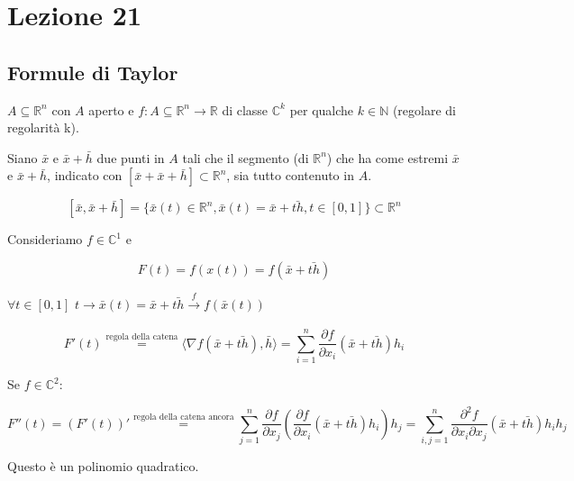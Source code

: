 \documentclass[../appunti-analisi.tex]{subfiles}
\begin{document}
\section{Lezione 21}

\subsection{Formule di Taylor}

$A \subseteq \mathbb{R}^{n}$ con $A$ aperto e $f:A \subseteq \mathbb{R}^{n} \rightarrow \mathbb{R}$ di classe $\mathbb{C}^{k}$ per qualche $k \in \mathbb{N}$ (regolare di regolarità k).

Siano $\bar{x}$ e $\bar{x} +\bar{h} $ due punti in $A$ tali che il segmento (di $\mathbb{R}^{n}$) che ha come estremi $\bar{x} $ e $\bar{x} + \bar{h} $, indicato con $[\bar{x} +\bar{x} +\bar{h} ] \subset \mathbb{R}^{n}$, sia tutto contenuto in $A$.

       \[
           [\bar{x} , \bar{x} +\bar{h} ] = \{\bar{x} (t) \in \mathbb{R}^{n}, \bar{x} (t) = \bar{x} +\bar{th}, t \in [0,1]\} \subset \mathbb{R}^{n}
       \]

       Consideriamo $f \in \mathbb{C}^{1}$ e 

       \[
           F(t) = f(x(t)) = f(\bar{x} +\bar{th} ) 
       \]

       $\forall t \in [0,1]$ $t \rightarrow  \bar{x} (t) = \bar{x} + \bar{th} \xrightarrow[]{\text{$f$}}f(\bar{x} (t))$

       \[
           F'(t) \overset{\text{regola della catena}}{=} \langle \nabla f(\bar{x} +\bar{th} ),\bar{h}  \rangle = \sum^{n}_{i=1} \frac{\partial f}{\partial x_i} (\bar{x} +\bar{th} ) h_i
       \]

       Se $f \in  \mathbb{C}^{2}$:

       \[
           F''(t) = (F'(t))' \overset{\text{regola della catena ancora}}{=} \sum^{n}_{j=1} \frac{\partial f}{\partial x_j} ( \frac{\partial f}{\partial x_i}(\bar{x} +\bar{th} ) h_i) h_j = \sum^{n}_{i,j=1} \frac{\partial^{2} f}{\partial x_i \partial x_j} (\bar{x} + \bar{th} ) h_i h_j
       \]

       Questo è un polinomio quadratico.

       
\end{document}
